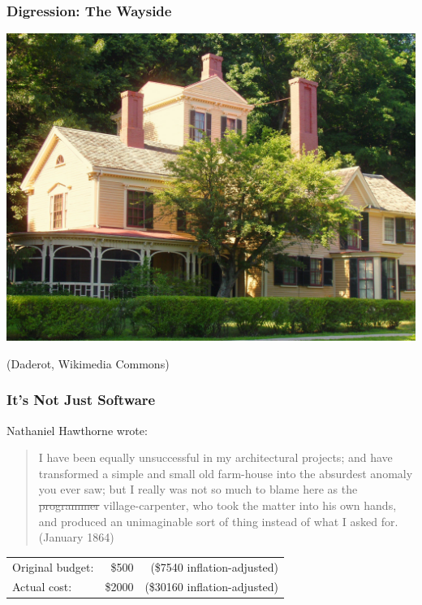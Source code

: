 \documentclass[aspectratio=43]{beamer}
\newenvironment{changemargin}[1]{%
  \begin{list}{}{%
    \setlength{\topsep}{0pt}%
    \setlength{\leftmargin}{#1}%
    \setlength{\rightmargin}{1em}
    \setlength{\listparindent}{\parindent}%
    \setlength{\itemindent}{\parindent}%
    \setlength{\parsep}{\parskip}%
  }%
  \item[]}{\end{list}}
\begin{document}
\begin{frame}
  \frametitle{Digression: The Wayside}

  \begin{center}
    \includegraphics[width=.7\textwidth]{L21/The_Wayside_Concord_Massachusetts}
  \end{center}
\hfill (Daderot, Wikimedia Commons)

\end{frame}

\begin{frame}
  \frametitle{It's Not Just Software}

\begin{changemargin}{1.5cm}
Nathaniel Hawthorne wrote:
\end{changemargin}
\begin{quote}
I have been equally unsuccessful in my architectural projects; and have transformed a simple and small old farm-house into the absurdest anomaly you ever saw; but I really was not so much to blame here as the \sout{programmer} village-carpenter, who took the matter into his own hands, and produced an unimaginable sort of thing instead of what I asked for. (January 1864)
\end{quote}

\begin{changemargin}{1.5cm}
\begin{tabular}{lrr}
Original budget:& \$500 &(\$7540 inflation-adjusted)\\
Actual cost: &\$2000 &(\$30160 inflation-adjusted)
\end{tabular}
\end{changemargin}


\end{frame}
\end{document}
